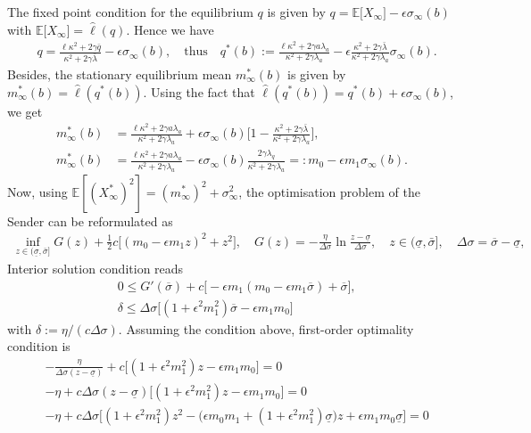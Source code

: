 \documentclass[a4paper,10pt]{article}
\newcommand{\EE}{\mathbb{E}}
\theoremstyle{definition}
\theoremstyle{plain}
\numberwithin{equation}{section}
\begin{document}
The fixed point condition for the equilibrium $q$ is given by $q = \EE\big[ X_\infty\big] - \epsilon \sigma_\infty(b)$ with $\EE\big[ X_\infty\big] = \hat\ell(q)$. Hence we have
\begin{align*}
&q = \frac{\ell \kappa^2 + 2\gamma \bar q}{\kappa^2 + 2\gamma\bar\lambda} - \epsilon \sigma_\infty(b), \quad \text{thus} \quad
 q^\ast(b) := \frac{\ell\kappa^2 + 2\gamma a \lambda_a}{\kappa^2 + 2\gamma  \lambda_a}
- \epsilon \frac{\kappa^2 + 2\gamma\bar\lambda}{\kappa^2 + 2\gamma \lambda_a} \sigma_\infty(b).
\end{align*}
Besides, the stationary equilibrium mean $m_\infty^\ast(b)$ is given by $m_\infty^\ast(b) = \hat\ell(q^\ast(b))$. Using the fact that  $\hat\ell(q^\ast(b)) = q^\ast(b) + \epsilon \sigma_\infty(b)$, we get
\begin{align*}
m_\infty^\ast(b) &= \frac{\ell\kappa^2 + 2\gamma a \lambda_a}{\kappa^2 + 2\gamma  \lambda_a} + 
\epsilon\sigma_\infty(b)
 \Big[ 1 -  \frac{\kappa^2 + 2\gamma\bar\lambda}{\kappa^2 + 2\gamma \lambda_a}\Big], \\
m_\infty^\ast(b) & = \frac{\ell\kappa^2 + 2\gamma a \lambda_a}{\kappa^2 + 2\gamma  \lambda_a} 
- \epsilon\sigma_\infty(b)
  \frac{2\gamma \lambda_q}{\kappa^2 + 2\gamma \lambda_a} =: m_0 - \epsilon m_1 \sigma_\infty(b).
  \end{align*}
Now, using  $\mathbb E[(X^\ast_\infty)^2]= (m_\infty^\ast)^2 + \sigma_\infty^2$, the optimisation problem of the Sender can be reformulated as
\begin{align*}
\inf_{z \in (\underline\sigma, \bar\sigma]} G(z) +  \frac12 c \big[ (m_0 - \epsilon m_1 z)^2 + z^2\big], \quad
G(z) = -  \frac{\eta}{\Delta \sigma} \ln\frac{z - \underline\sigma}{\Delta\sigma}, \quad z \in (\underline\sigma, \bar\sigma], \quad \Delta\sigma = \overline\sigma - \underline\sigma,
\end{align*}
Interior solution condition reads
\begin{align*}
&0 \leq G'(\overline\sigma) + c\big[ -\epsilon m_1 (m_0 - \epsilon m_1 \overline\sigma) + \overline\sigma\big], \\
&\delta \leq   \Delta\sigma \big[(1 + \epsilon^2 m_1^2) \overline\sigma -\epsilon m_1 m_0\big]
\end{align*}
with  $\delta := \eta/(c \Delta\sigma)$.
Assuming the condition above, first-order optimality condition is
\begin{align*}
&-\frac{\eta}{\Delta\sigma(z-\underline\sigma)} + c \big[ (1+\epsilon^2 m_1^2) z -\epsilon m_1 m_0\big] = 0 \\
&- \eta + c \Delta\sigma (z-\underline\sigma) \big[ (1+\epsilon^2 m_1^2) z -\epsilon m_1 m_0 \big] = 0 \\
&- \eta + c \Delta\sigma  
 \big[ (1+\epsilon^2 m_1^2) z^2 
 - \big( \epsilon m_0 m_1 + (1+\epsilon^2 m_1^2)\underline\sigma  \big) z 
 + \epsilon m_1 m_0 \underline\sigma \big] = 0 
\end{align*}
\end{document}
